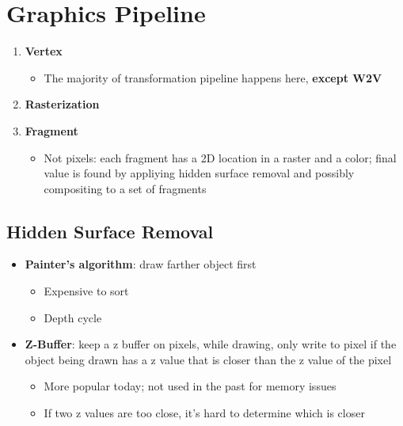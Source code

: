 \section{Graphics Pipeline}

  \begin{enumerate}
    \item \textbf{Vertex}
    \begin{itemize}
      \item The majority of transformation pipeline happens here,
      \textbf{except W2V}
    \end{itemize}
    \item \textbf{Rasterization}
    \item \textbf{Fragment}
    \begin{itemize}
      \item Not pixels: each fragment has a 2D location in a raster and a color;
      final value is found by appliying hidden surface removal and possibly
      compositing to a set of fragments
    \end{itemize}
  \end{enumerate}

  \subsection{Hidden Surface Removal}

    \begin{itemize}
      \item \textbf{Painter's algorithm}: draw farther object first
      \begin{itemize}
        \item Expensive to sort
        \item Depth cycle
      \end{itemize}

      \item \textbf{Z-Buffer}: keep a z buffer on pixels, while drawing,
      only write to pixel if the object being drawn has a z value that is
      closer than the z value of the pixel
      \begin{itemize}
        \item More popular today; not used in the past for memory issues
        \item If two z values are too close, it's hard to determine which is
        closer
      \end{itemize}
    \end{itemize}
